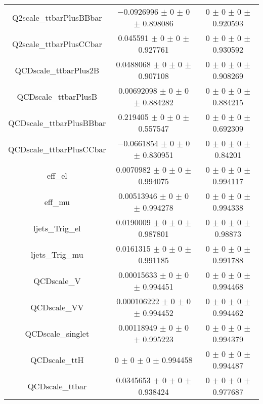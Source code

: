 \begin{table}
\begin{tabular}{ccc}
Q2scale\_ttbarPlusBBbar & \num{-0.0926996} $\pm$ \num{0} $\pm$ \num{0} $\pm$ \num{0.898086} & \num{0} $\pm$ \num{0} $\pm$ \num{0} $\pm$ \num{0.920593}\\
Q2scale\_ttbarPlusCCbar & \num{0.045591} $\pm$ \num{0} $\pm$ \num{0} $\pm$ \num{0.927761} & \num{0} $\pm$ \num{0} $\pm$ \num{0} $\pm$ \num{0.930592}\\
QCDscale\_ttbarPlus2B & \num{0.0488068} $\pm$ \num{0} $\pm$ \num{0} $\pm$ \num{0.907108} & \num{0} $\pm$ \num{0} $\pm$ \num{0} $\pm$ \num{0.908269}\\
QCDscale\_ttbarPlusB & \num{0.00692098} $\pm$ \num{0} $\pm$ \num{0} $\pm$ \num{0.884282} & \num{0} $\pm$ \num{0} $\pm$ \num{0} $\pm$ \num{0.884215}\\
QCDscale\_ttbarPlusBBbar & \num{0.219405} $\pm$ \num{0} $\pm$ \num{0} $\pm$ \num{0.557547} & \num{0} $\pm$ \num{0} $\pm$ \num{0} $\pm$ \num{0.692309}\\
QCDscale\_ttbarPlusCCbar & \num{-0.0661854} $\pm$ \num{0} $\pm$ \num{0} $\pm$ \num{0.830951} & \num{0} $\pm$ \num{0} $\pm$ \num{0} $\pm$ \num{0.84201}\\
eff\_el & \num{0.0070982} $\pm$ \num{0} $\pm$ \num{0} $\pm$ \num{0.994075} & \num{0} $\pm$ \num{0} $\pm$ \num{0} $\pm$ \num{0.994117}\\
eff\_mu & \num{0.00513946} $\pm$ \num{0} $\pm$ \num{0} $\pm$ \num{0.994278} & \num{0} $\pm$ \num{0} $\pm$ \num{0} $\pm$ \num{0.994338}\\
ljets\_Trig\_el & \num{0.0190009} $\pm$ \num{0} $\pm$ \num{0} $\pm$ \num{0.987801} & \num{0} $\pm$ \num{0} $\pm$ \num{0} $\pm$ \num{0.98873}\\
ljets\_Trig\_mu & \num{0.0161315} $\pm$ \num{0} $\pm$ \num{0} $\pm$ \num{0.991185} & \num{0} $\pm$ \num{0} $\pm$ \num{0} $\pm$ \num{0.991788}\\
QCDscale\_V & \num{0.00015633} $\pm$ \num{0} $\pm$ \num{0} $\pm$ \num{0.994451} & \num{0} $\pm$ \num{0} $\pm$ \num{0} $\pm$ \num{0.994468}\\
QCDscale\_VV & \num{0.000106222} $\pm$ \num{0} $\pm$ \num{0} $\pm$ \num{0.994452} & \num{0} $\pm$ \num{0} $\pm$ \num{0} $\pm$ \num{0.994462}\\
QCDscale\_singlet & \num{0.00118949} $\pm$ \num{0} $\pm$ \num{0} $\pm$ \num{0.995223} & \num{0} $\pm$ \num{0} $\pm$ \num{0} $\pm$ \num{0.994379}\\
QCDscale\_ttH & \num{0} $\pm$ \num{0} $\pm$ \num{0} $\pm$ \num{0.994458} & \num{0} $\pm$ \num{0} $\pm$ \num{0} $\pm$ \num{0.994487}\\
QCDscale\_ttbar & \num{0.0345653} $\pm$ \num{0} $\pm$ \num{0} $\pm$ \num{0.938424} & \num{0} $\pm$ \num{0} $\pm$ \num{0} $\pm$ \num{0.977687}\\

\end{tabular}
\end{table}
